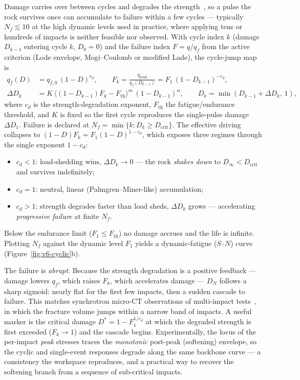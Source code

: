 \documentclass[11pt,a4paper,openany]{book}
\theoremstyle{handbook}
\begin{document}
Damage carries over between cycles and degrades the strength~\cite{ZHU2024105948},
so a pulse the rock survives once can accumulate to failure within a few cycles --- typically
$N_f\!\lesssim\!10$ at the high dynamic levels used in practice, where applying
tens or hundreds of impacts is neither feasible nor observed. With cycle index $k$
(damage $D_{k-1}$ entering cycle $k$, $D_0=0$) and the failure index $F=q/q_f$
from the active criterion (Lode envelope, Mogi--Coulomb or modified Lade), the
cycle-jump map is
%
\begin{align}
q_f(D) &= q_{f,0}\,(1-D)^{c_d}, \qquad
F_k = \frac{q_{\mathrm{peak}}}{q_f(D_{k-1})} = F_1\,(1-D_{k-1})^{-c_d}, \\
\Delta D_k &= K\,\big\langle (1-D_{k-1})F_k - F_{\mathrm{th}} \big\rangle^{m}\,(1-D_{k-1})^{\alpha},
\qquad D_k = \min(D_{k-1}+\Delta D_k,\,1),
\end{align}
%
where $c_d$ is the strength-degradation exponent, $F_{\mathrm{th}}$ the
fatigue/endurance threshold, and $K$ is fixed so the first cycle reproduces the
single-pulse damage $\Delta D_1$. Failure is declared at
$N_f=\min\{k:D_k\ge D_{\mathrm{crit}}\}$. The effective driving collapses to
$(1-D)F_k = F_1(1-D)^{1-c_d}$, which exposes three regimes through the single
exponent $1-c_d$:
%
\begin{itemize}
  \item $c_d<1$: load-shedding wins, $\Delta D_k\!\to\!0$ --- the rock
    \emph{shakes down} to $D_\infty<D_{\mathrm{crit}}$ and survives indefinitely;
  \item $c_d=1$: neutral, linear (Palmgren--Miner-like) accumulation;
  \item $c_d>1$: strength degrades faster than load sheds, $\Delta D_k$ grows ---
    accelerating \emph{progressive failure} at finite $N_f$.
\end{itemize}
%
Below the endurance limit ($F_1\le F_{\mathrm{th}}$) no damage accrues and the
life is infinite. Plotting $N_f$ against the dynamic level $F_1$ yields a
dynamic-fatigue ($S$--$N$) curve (Figure~\ref{fig:v6-cyclic}b).

The failure is \emph{abrupt}. Because the strength degradation is a positive
feedback --- damage lowers $q_f$, which raises $F_k$, which accelerates damage ---
$D_N$ follows a sharp sigmoid: nearly flat for the first few impacts, then a
sudden cascade to failure. This matches synchrotron micro-CT observations of
multi-impact tests~\cite{wang2022progressive}, in which the fracture volume jumps
within a narrow band of impacts. A useful marker is the critical damage
$D^\ast=1-F_1^{1/c_d}$ at which the degraded strength is first exceeded
($F_k\!\to\!1$) and the cascade begins. Experimentally, the locus of the
per-impact \emph{peak} stresses traces the \emph{monotonic} post-peak (softening)
envelope, so the cyclic and single-event responses degrade along the same
backbone curve --- a consistency the workspace reproduces, and a practical way to
recover the softening branch from a sequence of sub-critical impacts.
\end{document}
